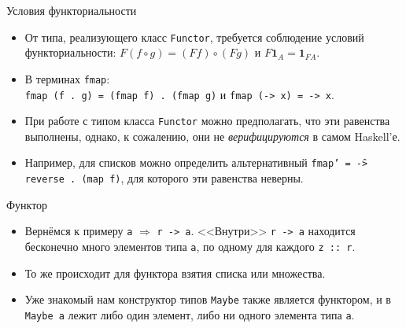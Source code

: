\documentclass[xcolor=dvipsnames]{beamer}
\newcommand{\One}{\mathbf{1}}
\begin{document}
\begin{frame}{Условия функториальности}
 \begin{itemize}[<+->]
 \item От типа, реализующего класс \texttt{Functor}, требуется соблюдение условий функториальности: $F(f \circ g) = (F f) \circ (F g)$ и $F \One_A = \One_{FA}$.
 \item В терминах \texttt{fmap}:\\
 \texttt{fmap (f . g) = (fmap f) . (fmap g)} и \texttt{fmap (\x -> x) = \x -> x}.
 \item При работе с типом класса \texttt{Functor} можно предполагать, что эти равенства выполнены, однако, к сожалению, они не {\em верифицируются} в самом Haskell'е.
 \item Например, для списков можно определить альтернативный \texttt{fmap' = \f -> reverse .                                                                                                                                                                                                                                                                                                                                                                                                                                                                                                                   (map f)}, для которого эти равенства неверны.
\end{itemize}

\end{frame}

\begin{frame}{Функтор}
 
 \begin{itemize}[<+->]
  \item Вернёмся к примеру \texttt{a} $\Rightarrow$ \texttt{r -> a}. <<Внутри>> \texttt{r -> a} находится бесконечно много элементов типа \texttt{a}, по одному для каждого \texttt{z :: r}.
  \item То же происходит для функтора взятия списка или множества.
  \item Уже знакомый нам конструктор типов \texttt{Maybe} также является функтором, и в \texttt{Maybe a} лежит либо один элемент, либо ни одного элемента типа \texttt{a}.
 \end{itemize}

\end{frame}
\end{document}
